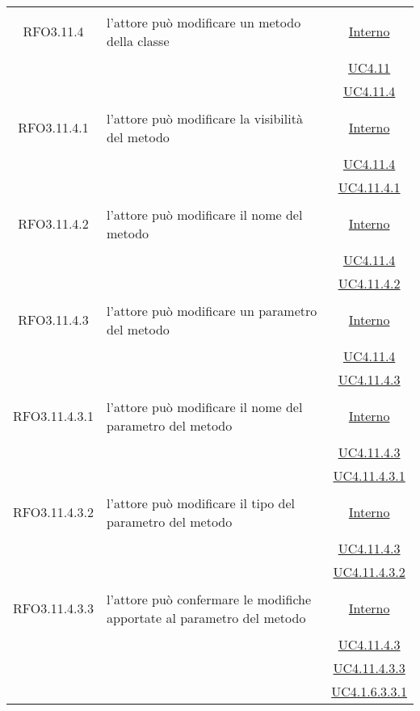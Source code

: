 \begin{longtable}{|c|>{\centering}m{7cm}|c|}
\hypertarget{RFO3.11.4}{RFO3.11.4} & l'attore può modificare un metodo della classe &  \hyperlink{Interno}{Interno}\\
& &\hyperref[UC4.11]{UC4.11}\\
& &\hyperref[UC4.11.4]{UC4.11.4}\\ \hline

\hypertarget{RFO3.11.4.1}{RFO3.11.4.1} & l'attore può modificare la visibilità del metodo &  \hyperlink{Interno}{Interno}\\
& &\hyperref[UC4.11.4]{UC4.11.4}\\
& &\hyperref[UC4.11.4.1]{UC4.11.4.1}\\ \hline

\hypertarget{RFO3.11.4.2}{RFO3.11.4.2} & l'attore può modificare il nome del metodo &  \hyperlink{Interno}{Interno}\\
& &\hyperref[UC4.11.4]{UC4.11.4}\\
& &\hyperref[UC4.11.4.2]{UC4.11.4.2}\\ \hline

\hypertarget{RFO3.11.4.3}{RFO3.11.4.3} & l'attore può modificare un parametro del metodo &  \hyperlink{Interno}{Interno}\\
& &\hyperref[UC4.11.4]{UC4.11.4}\\
& &\hyperref[UC4.11.4.3]{UC4.11.4.3}\\ \hline

\hypertarget{RFO3.11.4.3.1}{RFO3.11.4.3.1} & l'attore può modificare il nome del parametro del metodo &  \hyperlink{Interno}{Interno}\\
& &\hyperref[UC4.11.4.3]{UC4.11.4.3}\\
& &\hyperref[UC4.11.4.3.1]{UC4.11.4.3.1}\\ \hline

\hypertarget{RFO3.11.4.3.2}{RFO3.11.4.3.2} & l'attore può modificare il tipo del parametro del metodo &  \hyperlink{Interno}{Interno}\\
& &\hyperref[UC4.11.4.3]{UC4.11.4.3}\\
& &\hyperref[UC4.11.4.3.2]{UC4.11.4.3.2}\\ \hline

\hypertarget{RFO3.11.4.3.3}{RFO3.11.4.3.3} & l'attore può confermare le modifiche apportate al parametro del metodo &  \hyperlink{Interno}{Interno}\\
& &\hyperref[UC4.11.4.3]{UC4.11.4.3}\\
& &\hyperref[UC4.11.4.3.3]{UC4.11.4.3.3}\\
& &\hyperref[UC4.1.6.3.3.1]{UC4.1.6.3.3.1}\\ \hline


\end{longtable}
